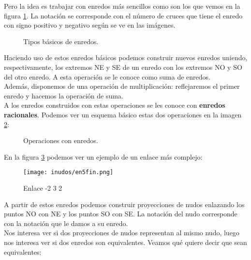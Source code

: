 Pero la idea es trabajar con enredos más sencillos como son los que vemos en la figura \ref{conw2}. La notación se corresponde con el número de cruces que tiene el enredo con signo positivo y negativo según se ve en las imágenes.\\
   \begin{figure}[h!]
   	\centering
   	
   	
   	\caption{Tipos básicos de enredos.}
   	\label{conw2} 
   \end{figure} 

Haciendo uso de estos enredos básicos podemos construir nuevos enredos uniendo, respectivamente, los extremos NE y SE de un enredo con los extremos NO y SO del otro enredo. A esta operación se le conoce como suma de enredos.\\
Además, disponemos de una operación de multiplicación: reflejaremos el primer enredo y hacemos la operación de suma.\\
A los enredos construidos con estas operaciones se les conoce con \textbf{enredos racionales}. Podemos ver un esquema básico estas dos operaciones en la imagen \ref{conw3}:\\
   \begin{figure}[h!]
   	\centering
   	\caption{Operaciones con enredos.}
   	\label{conw3} 
   \end{figure}

En la figura \ref{conw4} podemos ver un ejemplo de un enlace más complejo:
\begin{figure}[h!]
	\centering
	\texttt{[image: inudos/en5fin.png]}
	\caption{Enlace -2 3 2}
	\label{conw4} 
\end{figure}

A partir de estos enredos podemos construir proyecciones de nudos enlazando los puntos NO con NE y los puntos SO con SE. La notación del nudo corresponde con la notación que le damos a su enredo.\\ 

Nos interesa ver si dos proyecciones de nudos representan al mismo nudo, luego nos interesa ver si dos enredos son equivalentes. Veamos qué quiere decir que sean equivalentes:\\

